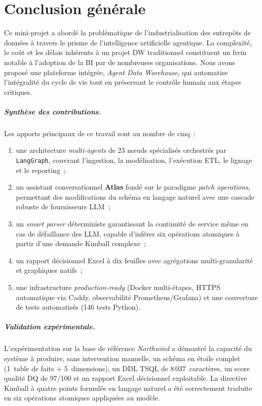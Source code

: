 \documentclass[12pt, a4paper]{report}
\begin{document}
\chapter*{Conclusion générale}

Ce mini-projet a abordé la problématique de l'industrialisation des
entrepôts de données à travers le prisme de l'intelligence artificielle
agentique. La complexité, le coût et les délais inhérents à un projet
\ac{DW} traditionnel constituent un frein notable à l'adoption de la
\ac{BI} par de nombreuses organisations. Nous avons proposé une
plateforme intégrée, \emph{Agent Data Warehouse}, qui automatise
l'intégralité du cycle de vie tout en préservant le contrôle humain
aux étapes critiques.

\paragraph{Synthèse des contributions.}
Les apports principaux de ce travail sont au nombre de cinq~:
\begin{enumerate}
  \item une architecture \emph{multi-agents} de 23 nœuds spécialisés
        orchestrés par \texttt{LangGraph}, couvrant l'ingestion,
        la modélisation, l'exécution \ac{ETL}, le lignage et le
        reporting~;
  \item un assistant conversationnel \textbf{Atlas} fondé sur le
        paradigme \emph{patch operations}, permettant des
        modifications du schéma en langage naturel avec une
        cascade robuste de fournisseurs \ac{LLM}~;
  \item un \emph{smart parser} déterministe garantissant la
        continuité de service même en cas de défaillance des
        \ac{LLM}, capable d'inférer six opérations atomiques à
        partir d'une demande Kimball complexe~;
  \item un rapport décisionnel Excel à dix feuilles avec
        agrégations multi-granularité et graphiques natifs~;
  \item une infrastructure \emph{production-ready} (Docker
        multi-étapes, \ac{HTTPS} automatique via Caddy,
        observabilité Prometheus/Grafana) et une couverture de
        tests automatisés (146 tests Python).
\end{enumerate}

\paragraph{Validation expérimentale.}
L'expérimentation sur la base de référence \textit{Northwind} a
démontré la capacité du système à produire, sans intervention
manuelle, un schéma en étoile complet (1~table de faits +
5~dimensions), un \ac{DDL} \ac{TSQL} de 8\,037~caractères, un score
qualité \ac{DQ} de 97/100 et un rapport Excel décisionnel
exploitable. La directive Kimball à quatre points formulée en
langage naturel a été correctement traduite en six opérations
atomiques appliquées au modèle.
\end{document}
